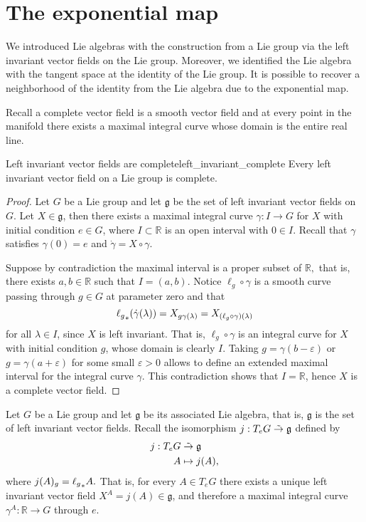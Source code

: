 \section{The exponential map}
We introduced Lie algebras with the construction from a Lie group via the left invariant vector fields on the Lie group. Moreover, we identified the Lie algebra with the tangent space at the identity of the Lie group. It is possible to recover a neighborhood of the identity from the Lie algebra due to the exponential map.

Recall a complete vector field is a smooth vector field and at every point in the manifold there exists a maximal integral curve whose domain is the entire real line.
\begin{theorem}{Left invariant vector fields are complete}{left_invariant_complete}
    Every left invariant vector field on a Lie group is complete.
\end{theorem}
\begin{proof}
    Let \(G\) be a Lie group and let \(\mathfrak{g}\) be the set of left invariant vector fields on \(G\). Let \(X \in \mathfrak{g}\), then there exists a maximal integral curve \(\gamma : I\to G\) for \(X\) with initial condition \(e \in G\), where \(I\subset \mathbb{R}\) is an open interval with \(0 \in I\). Recall that \(\gamma\) satisfies \(\gamma(0) = e\) and \(\dot{\gamma} = X\circ\gamma.\)

    Suppose by contradiction the maximal interval is a proper subset of \(\mathbb{R},\) that is, there exists \(a, b \in \mathbb{R}\) such that \(I = (a,b).\) Notice \(\ell_g \circ \gamma\) is a smooth curve passing through \(g \in G\) at parameter zero and that
    \begin{equation*}
        {\ell_g}_{\ast{}}(\dot{\gamma}(\lambda)) = X_{g \gamma(\lambda)} = X_{(\ell_g \circ \gamma)(\lambda)}
    \end{equation*}
    for all \(\lambda \in I\), since \(X\) is left invariant. That is, \(\ell_g \circ \gamma\) is an integral curve for \(X\) with initial condition \(g\), whose domain is clearly \(I\). Taking \(g = \gamma(b - \varepsilon)\) or \(g = \gamma(a + \varepsilon)\) for some small \(\varepsilon > 0\) allows to define an extended maximal interval for the integral curve \(\gamma\). This contradiction shows that \(I = \mathbb{R}\), hence \(X\) is a complete vector field.
\end{proof}

Let \(G\) be a Lie group and let \(\mathfrak{g}\) be its associated Lie algebra, that is, \(\mathfrak{g}\) is the set of left invariant vector fields. Recall the isomorphism \(j : T_eG \mathrel{\tilde{\to}} \mathfrak{g}\) defined by
\begin{align*}
    j : T_eG &\mathrel{\tilde{\to}} \mathfrak{g}\\
           A &\mapsto j(A),
\end{align*}
where \(j(A)_g = {\ell_g}_{\ast{}}A.\) That is, for every \(A \in T_eG\) there exists a unique left invariant vector field \(X^A = j(A) \in \mathfrak{g}\), and therefore a maximal integral curve \(\gamma^A : \mathbb{R} \to G\) through \(e\).

